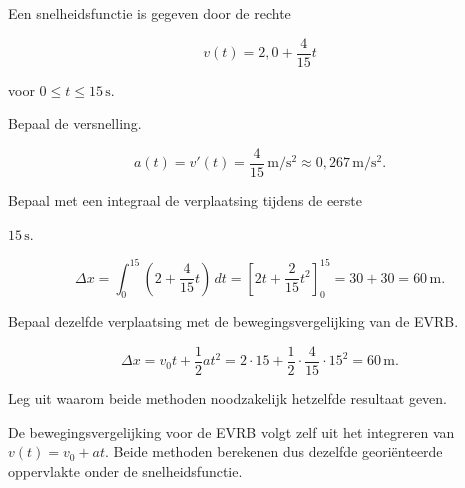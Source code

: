 \documentclass{ximera}
\begin{document}
\begin{oefening}{\oefU\ESS}

Een snelheidsfunctie is gegeven door de rechte

\[v(t)=2,0+\frac{4}{15}t\]

voor $0\leq t\leq15\,\mathrm{s}$.

\begin{question}

Bepaal de versnelling.

\begin{oplossing}
\[a(t)=v'(t)=\frac4{15}\,\mathrm{m/s^2}\approx0,267\,\mathrm{m/s^2}.\]
\end{oplossing}

\end{question}

\begin{question}

Bepaal met een integraal de verplaatsing tijdens de eerste

$15\,\mathrm{s}$.

\begin{oplossing}
\[\Delta x=\int_0^{15}\left(2+\frac4{15}t\right)\,dt =\left[2t+\frac2{15}t^2\right]_0^{15}=30+30=60\,\mathrm{m}.\]
\end{oplossing}

\end{question}

\begin{question}

Bepaal dezelfde verplaatsing met de bewegingsvergelijking van de EVRB.

\begin{oplossing}
\[\Delta x=v_0t+\frac12at^2 =2\cdot15+\frac12\cdot\frac4{15}\cdot15^2 =60\,\mathrm{m}.\]
\end{oplossing}

\end{question}

\begin{question}

Leg uit waarom beide methoden noodzakelijk hetzelfde resultaat geven.

\begin{oplossing}
De bewegingsvergelijking voor de EVRB volgt zelf uit het integreren van \(v(t)=v_0+at\). Beide methoden berekenen dus dezelfde georiënteerde oppervlakte onder de snelheidsfunctie.
\end{oplossing}

\end{question}

\end{oefening}
\end{document}
